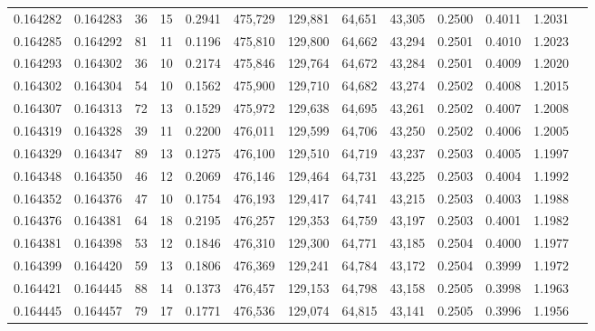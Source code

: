 \begin{tabular}{rrrrrrrrrrrrr}
0.164282 & 0.164283 &    36 &  15 &                                     0.2941 & 475,729 & 129,881 &  64,651 &  43,305 & 0.2500 & 0.4011 & 1.2031 \\
0.164285 & 0.164292 &    81 &  11 &                                     0.1196 & 475,810 & 129,800 &  64,662 &  43,294 & 0.2501 & 0.4010 & 1.2023 \\
0.164293 & 0.164302 &    36 &  10 &                                     0.2174 & 475,846 & 129,764 &  64,672 &  43,284 & 0.2501 & 0.4009 & 1.2020 \\
0.164302 & 0.164304 &    54 &  10 &                                     0.1562 & 475,900 & 129,710 &  64,682 &  43,274 & 0.2502 & 0.4008 & 1.2015 \\
0.164307 & 0.164313 &    72 &  13 &                                     0.1529 & 475,972 & 129,638 &  64,695 &  43,261 & 0.2502 & 0.4007 & 1.2008 \\
0.164319 & 0.164328 &    39 &  11 &                                     0.2200 & 476,011 & 129,599 &  64,706 &  43,250 & 0.2502 & 0.4006 & 1.2005 \\
0.164329 & 0.164347 &    89 &  13 &                                     0.1275 & 476,100 & 129,510 &  64,719 &  43,237 & 0.2503 & 0.4005 & 1.1997 \\
0.164348 & 0.164350 &    46 &  12 &                                     0.2069 & 476,146 & 129,464 &  64,731 &  43,225 & 0.2503 & 0.4004 & 1.1992 \\
0.164352 & 0.164376 &    47 &  10 &                                     0.1754 & 476,193 & 129,417 &  64,741 &  43,215 & 0.2503 & 0.4003 & 1.1988 \\
0.164376 & 0.164381 &    64 &  18 &                                     0.2195 & 476,257 & 129,353 &  64,759 &  43,197 & 0.2503 & 0.4001 & 1.1982 \\
0.164381 & 0.164398 &    53 &  12 &                                     0.1846 & 476,310 & 129,300 &  64,771 &  43,185 & 0.2504 & 0.4000 & 1.1977 \\
0.164399 & 0.164420 &    59 &  13 &                                     0.1806 & 476,369 & 129,241 &  64,784 &  43,172 & 0.2504 & 0.3999 & 1.1972 \\
0.164421 & 0.164445 &    88 &  14 &                                     0.1373 & 476,457 & 129,153 &  64,798 &  43,158 & 0.2505 & 0.3998 & 1.1963 \\
0.164445 & 0.164457 &    79 &  17 &                                     0.1771 & 476,536 & 129,074 &  64,815 &  43,141 & 0.2505 & 0.3996 & 1.1956 \\

\end{tabular}
